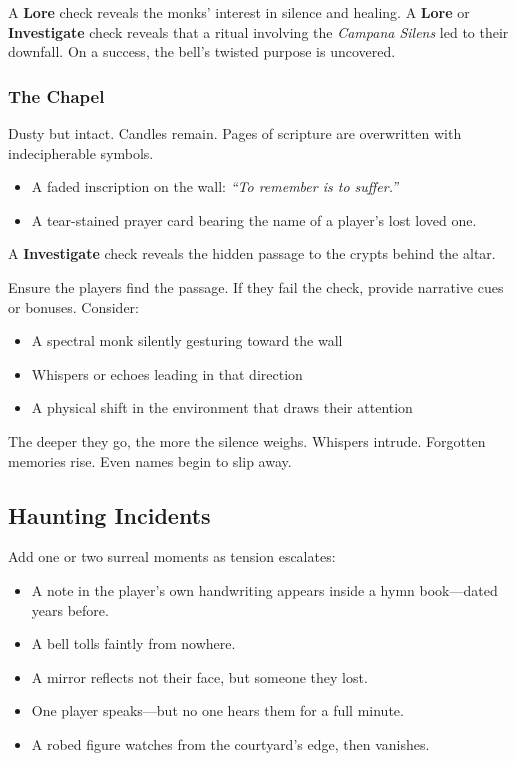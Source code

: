 \documentclass[twocolumn,nodeprecatedcode,bg=print]{dndbook/dndbook}
\begin{document}
A \Challenging \textbf{Lore} check reveals the monks' interest in silence and healing. A \Difficult \textbf{Lore} or \textbf{Investigate} check reveals that a ritual involving the \emph{Campana Silens} led to their downfall. On a \Formidable success, the bell's twisted purpose is uncovered.

\subsubsection{The Chapel}
Dusty but intact. Candles remain. Pages of scripture are overwritten with indecipherable symbols.

\begin{WyrdExample}
    \begin{itemize}
        \item A faded inscription on the wall: \emph{“To remember is to suffer.”}
        \item A tear-stained prayer card bearing the name of a player’s lost loved one.
    \end{itemize}
\end{WyrdExample}

A \Challenging \textbf{Investigate} check reveals the hidden passage to the crypts behind the altar.

\begin{WyrdGmTips}
    Ensure the players find the passage. If they fail the check, provide narrative cues or bonuses. Consider:
    \begin{itemize}
        \item A spectral monk silently gesturing toward the wall
        \item Whispers or echoes leading in that direction
        \item A physical shift in the environment that draws their attention
    \end{itemize}
\end{WyrdGmTips}

\vspace{\baselineskip}
The deeper they go, the more the silence weighs. Whispers intrude. Forgotten memories rise. Even names begin to slip away.

\subsection{Haunting Incidents}

Add one or two surreal moments as tension escalates:
\begin{WyrdExample}
\begin{itemize}
    \item A note in the player’s own handwriting appears inside a hymn book—dated years before.
    \item A bell tolls faintly from nowhere.
    \item A mirror reflects not their face, but someone they lost.
    \item One player speaks—but no one hears them for a full minute.
    \item A robed figure watches from the courtyard's edge, then vanishes.
\end{itemize}
\end{WyrdExample}
\end{document}
